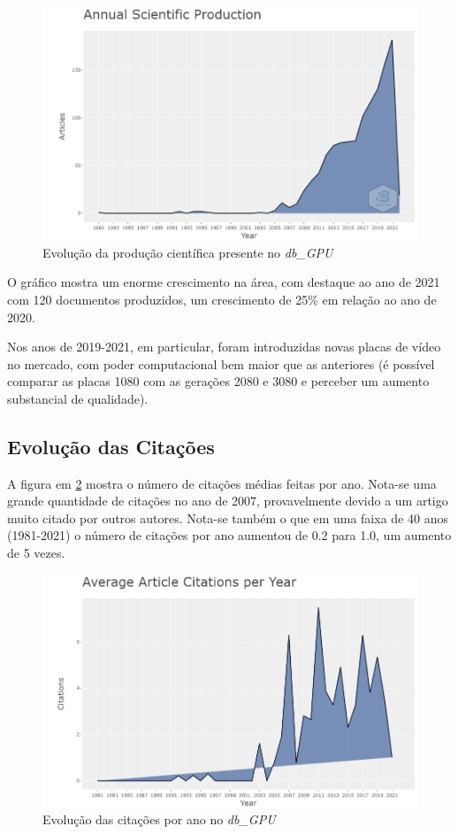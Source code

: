 \begin{figure}[ht]
    \centering
    \includegraphics[width=12cm]{experiments/gustavo-tomas/AnaliseBibliometrica/GPUs/Graficos/gpu-prod-cient.png}
    \caption{Evolução da produção científica presente no \textit{db\_GPU}}
    \label{fig:gpu-prod-cient}
\end{figure}

O gráfico mostra um enorme crescimento na área, com destaque ao ano de 2021 com 120 documentos produzidos, um crescimento de 25\% em relação ao ano de 2020.

Nos anos de 2019-2021, em particular, foram introduzidas novas placas de vídeo no mercado, com poder computacional bem maior que as anteriores (é possível comparar as placas 1080 com as gerações 2080 e 3080 e perceber um aumento substancial de qualidade).

\subsection{Evolução das Citações}

A figura em \ref{fig:gpu-citation-year} mostra o número de citações médias feitas por ano. Nota-se uma grande quantidade de citações no ano de 2007, provavelmente devido a um artigo muito citado por outros autores. Nota-se também o que em uma faixa de 40 anos (1981-2021) o número de citações por ano aumentou de 0.2 para 1.0, um aumento de 5 vezes.

\begin{figure}[ht]
    \centering
    \includegraphics[width=12cm]{experiments/gustavo-tomas/AnaliseBibliometrica/GPUs/Graficos/gpu-citation-year.png}
    \caption{Evolução das citações por ano no \textit{db\_GPU}}
    \label{fig:gpu-citation-year}
\end{figure}

